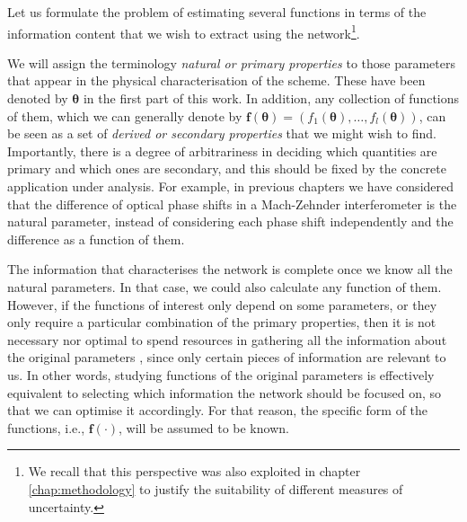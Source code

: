 Let us formulate the problem of estimating several functions in terms of the information content that we wish to extract using the network\footnote{We recall that this perspective was also exploited in chapter \ref{chap:methodology} to justify the suitability of different measures of uncertainty.}.

We will assign the terminology \emph{natural or primary properties} to those parameters that appear in the physical characterisation of the scheme. These have been denoted by $\boldsymbol{\theta}$ in the first part of this work. In addition, any collection of functions of them, which we can generally denote by $\boldsymbol{f}(\boldsymbol{\theta}) = (f_1(\boldsymbol{\theta}), \dots, f_l(\boldsymbol{\theta}))$, can be seen as  a set of \emph{derived or secondary properties} that we might wish to find. Importantly, there is a degree of arbitrariness in deciding which quantities are primary and which ones are secondary, and this should be fixed by the concrete application under analysis. For example, in previous chapters we have considered that the difference of optical phase shifts in a Mach-Zehnder interferometer is the natural parameter, instead of considering each phase shift independently and the difference as a function of them. 

The information that characterises the network is complete once we know all the natural parameters. In that case, we could also calculate any function of them. However, if the functions of interest only depend on some parameters, or they only require a particular combination of the primary properties, then it is not necessary nor optimal to spend resources in gathering all the information about the original parameters \cite{proctor2017networked}, since only certain pieces of information are relevant to us. In other words, studying functions of the original parameters is effectively equivalent to selecting which information the network should be focused on, so that we can optimise it accordingly.  For that reason, the specific form of the functions, i.e., $\boldsymbol{f}(\cdot)$, will be assumed to be known. 

